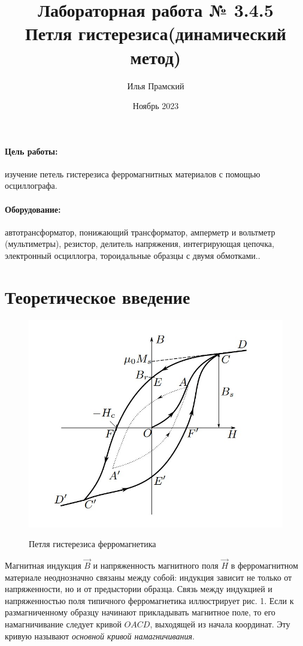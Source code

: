 \documentclass[a4paper,12pt]{article}
\title{Лабораторная работа № 3.4.5\\Петля гистерезиса(динамический метод)}
\author{Илья Прамский}
\date{Ноябрь 2023}
\begin{document}
\maketitle
\newpage

\paragraph*{Цель работы:} изучение петель гистерезиса ферромагнитных материалов с помощью осциллографа.
	
	\paragraph*{Оборудование:} автотрансформатор, понижающий трансформатор, амперметр и вольтметр (мультиметры), резистор, делитель напряжения, интегрирующая
	цепочка, электронный осциллогра, тороидальные образцы с двумя обмотками..
	
	\section{Теоретическое введение}
	
	\begin{figure}
		\vspace{-20pt}
		\begin{center}			\includegraphics[width=0.7\linewidth]{gist3.jpg}
			\label{fig:sdfsafd}
		\end{center}
		\vspace{-10pt}
		\caption{Петля гистерезиса ферромагнетика}
	\end{figure}

	Магнитная индукция $\vec{B}$ и напряженность магнитного поля
	$\vec{H}$ в ферромагнитном материале неоднозначно связаны
	между собой: индукция зависит не только от напряженности, но
	и от предыстории образца. Связь между индукцией
	и напряженностью поля типичного ферромагнетика иллюстрирует рис. 1. Если
	к размагниченному образцу начинают прикладывать магнитное поле, то его намагничивание следует кривой $ OACD $, выходящей
	из начала
	координат. Эту кривую называют \textit{основной кривой намагничивания}.
	
\end{document}
